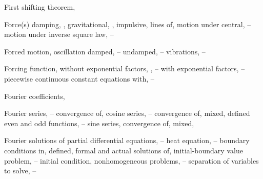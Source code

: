 \begin{theindex}
  \item First shifting theorem, \pageref{thmtype:8.1.3}

  \item Force(s)
    \subitem damping, \pageref{eq:4.4.6}, \pageref{eq:6.1.1}
    \subitem gravitational, \pageref{eq:4.3.1}, \pageref{eq:4.3.18}
    \subitem impulsive, \pageref{thmtype:8.7.1}
    \subitem lines of, \pageref{eq:4.5.16}
    \subitem motion under central, \pageref{eq:6.4.1}--\pageref{exer:6.4.6}
    \subitem motion under inverse square law, \pageref{eq:6.4.10}--\pageref{exer:6.4.6}

  \item Forced motion, \pageref{eq:6.1.1}
    \subitem oscillation
      \subsubitem damped, \pageref{eq:6.3.17}--\pageref{exer:6.3.1}
      \subsubitem undamped, \pageref{eq:6.1.13}--\pageref{exer:6.1.1}
    \subitem vibrations, \pageref{eq:6.2.11}--\pageref{exer:6.2.1}

  \item Forcing function, \pageref{eq:5.1.1}
    \subitem without exponential factors, \pageref{eq:10.2.2}, \pageref{example:10.2.1} \pageref{example:9.3.1}--\pageref{exer:9.3.1}
    \subitem with exponential factors, \pageref{exer:5.5.5}--\pageref{exer:5.5.1}
    \subitem piecewise continuous constant equations with, \pageref{eq:8.5.1}--\pageref{exer:8.5.26}

  \item Fourier coefficients, \pageref{thmtype:11.2.2}

  \item Fourier series, \pageref{thmtype:11.2.1}--\pageref{exer:11.3.60}
    \subitem convergence of, \pageref{thmtype:11.2.4}
    \subitem cosine series, \pageref{eq:11.3.1}--\pageref{example:11.3.1}
      \subsubitem convergence of, \pageref{thmtype:11.3.3}
      \subsubitem mixed, \pageref{eq:11.3.2}
      \subsubitem defined \pageref{thmtype:11.2.3}
    \subitem even and odd functions, \pageref{example:11.2.2}--\pageref{example:11.2.1}
    \subitem sine series, \pageref{thmtype:11.3.2}
      \subsubitem convergence of, \pageref{thmtype:11.3.2}
      \subsubitem mixed, \pageref{thmtype:11.3.4}

  \item Fourier solutions of partial differential equations, \pageref{eq:12.1.1}--\pageref{exer:12.4.7}
    \subitem heat equation, \pageref{eq:12.1.1}--\pageref{exer:12.1.54}
      \subsubitem boundary conditions in, \pageref{eq:12.1.1}
      \subsubitem defined, \pageref{eq:12.1.1}
      \subsubitem formal and actual solutions of, \pageref{eq:12.1.5}
      \subsubitem initial-boundary value problem, \pageref{eq:12.1.1}--\pageref{eq:12.1.13}
      \subsubitem initial condition, \pageref{eq:12.1.1}
      \subsubitem nonhomogeneous problems, \pageref{eq:12.1.9}--\pageref{eq:12.1.12}
      \subsubitem separation of variables to solve, \pageref{eq:12.1.1}--\pageref{thmtype:12.1.1}


\end{theindex}
